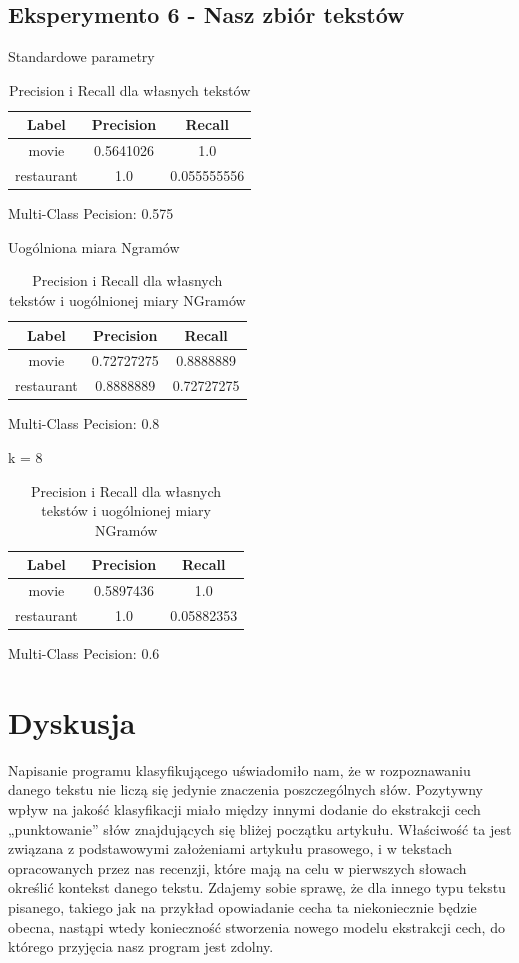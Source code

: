 \documentclass{classrep}
\begin{document}
\subsection{Eksperymento 6 - Nasz zbiór tekstów}
Standardowe parametry
\begin{table}[H]
\begin{tabular}{|c|c|c|}
\hline
Label      & Precision & Recall      \\ \hline
movie      & 0.5641026 & 1.0         \\ \hline
restaurant & 1.0       & 0.055555556 \\ \hline
\end{tabular}
\caption{Precision i Recall dla własnych tekstów}
\end{table}
Multi-Class Pecision: 0.575

Uogólniona miara Ngramów
\begin{table}[H]
\begin{tabular}{|c|c|c|}
\hline
Label      & Precision  & Recall     \\ \hline
movie      & 0.72727275 & 0.8888889  \\ \hline
restaurant & 0.8888889  & 0.72727275 \\ \hline
\end{tabular}
\caption{Precision i Recall dla własnych tekstów i uogólnionej miary NGramów}
\end{table}
Multi-Class Pecision: 0.8

k = 8
\begin{table}[H]
\begin{tabular}{|c|c|c|}
\hline
Label      & Precision & Recall     \\ \hline
movie      & 0.5897436 & 1.0        \\ \hline
restaurant & 1.0       & 0.05882353 \\ \hline
\end{tabular}
\caption{Precision i Recall dla własnych tekstów i uogólnionej miary NGramów}
\end{table}
Multi-Class Pecision: 0.6

\section{Dyskusja}
	Napisanie programu klasyfikującego uświadomiło nam, że w rozpoznawaniu danego tekstu nie liczą się jedynie znaczenia poszczególnych słów. Pozytywny wpływ na jakość klasyfikacji miało między innymi dodanie do ekstrakcji cech „punktowanie” słów znajdujących się bliżej początku artykułu. Właściwość ta jest związana z podstawowymi założeniami artykułu prasowego, i w tekstach opracowanych przez nas recenzji, które mają na celu w pierwszych słowach określić kontekst danego tekstu. Zdajemy sobie sprawę, że dla innego typu tekstu pisanego, takiego jak na przykład opowiadanie cecha ta niekoniecznie będzie obecna, nastąpi wtedy konieczność stworzenia nowego modelu ekstrakcji cech, do którego przyjęcia nasz program jest zdolny.
	
\end{document}
